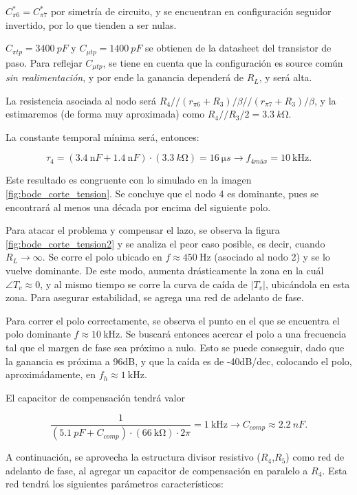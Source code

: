 \documentclass[]{article}
\begin{document}
	$C_{\pi6}^* = C_{\pi7}^*$ por simetría de circuito, y se encuentran en configuración seguidor invertido, por lo que tienden a ser nulas.
	
	$C_{\pi tp} = \SI{3400}{pF}$ y $C_{\mu tp} = \SI{1400}{pF}$  se obtienen de la datasheet del transistor de paso. Para reflejar $C_{\mu tp}$, se tiene en cuenta que la configuración es source común \textit{sin realimentación}, y por ende la ganancia dependerá de $R_L$, y será alta.
	
	La resistencia asociada al nodo será $R_4 // (r_{\pi6} + R_3) / \beta // (r_{\pi7} + R_3) / \beta$, y la estimaremos (de forma muy aproximada) como $R_4//R_3/2 = \SI{3.3}{k\ohm}$.
	
	La constante temporal mínima será, entonces:
	
	\begin{equation}
		\tau_4 = (\SI{3.4}{\nano F} + \SI{1.4}{\nano F}) \cdot (\SI{3.3}{k\ohm}) = \SI{16}{\micro s} \to f_{4 máx} = \SI{10}{\kilo\hertz}.
	\end{equation}
	
	Este resultado es congruente con lo simulado en la imagen \ref{fig:bode_corte_tension}. Se concluye que el nodo 4 es dominante, pues se encontrará al menos una década por encima del siguiente polo.
	
	Para atacar el problema y compensar el lazo, se observa la figura \ref{fig:bode_corte_tension2} y se analiza el peor caso posible, es decir, cuando $R_L \to \infty$. Se corre el polo ubicado en $f\approx \SI{450}{\hertz}$ (asociado al nodo 2) y se lo vuelve dominante. De este modo, aumenta drásticamente la zona en la cuál $\angle T_v \approx 0$, y al mismo tiempo se corre la curva de caída de $|T_v|$, ubicándola en esta zona. Para asegurar estabilidad, se agrega una red de adelanto de fase.
	
	Para correr el polo correctamente, se observa el punto en el que se encuentra el polo dominante $f \approx \SI{10}{\kilo\hertz}$. Se buscará entonces acercar el polo a una frecuencia tal que el margen de fase sea próximo a nulo. Esto se puede conseguir, dado que la ganancia es próxima a 96dB, y que la caída es de -40dB/dec, colocando el polo, aproximádamente, en $f_h \approx \SI{1}{\kilo\hertz}$.
	
	El capacitor de compensación tendrá valor
	
	$$\frac{1}{(\SI{5.1}{pF} + C_{comp}) \cdot (\SI{66}{\kilo\ohm}) \cdot 2\pi} = \SI{1}{\kilo\hertz} \to C_{comp} \approx \SI{2.2}{nF}.$$
	
	A continuación, se aprovecha la estructura divisor resistivo ($R_4$,$R_5$) como red de adelanto de fase, al agregar un capacitor de compensación en paralelo a $R_4$. Esta red tendrá los siguientes parámetros característicos:
	
\end{document}
